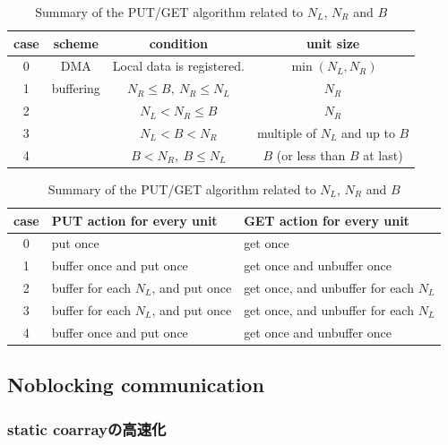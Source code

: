 \begin{table}[tbh]
 \caption{Summary of the PUT/GET algorithm related to $N_L$, $N_R$ and $B$}
 \label{tab:putget}
 \begin{flushleft}
  \begin{tabular}{|c||c|c|c|}
\hline
case & scheme 
& condition 
& unit size
\\
\hline
\hline
0 & DMA   
& Local data is registered.
& $\min(N_L, N_R)$   
\\
\hline
1 & buffering 
& $N_R \leq B,~ N_R \leq N_L$
& $N_R$
\\
\cline{1-1} \cline{3-4}
2 &
& $N_L < N_R \leq B$
& $N_R$
\\
\cline{1-1} \cline{3-4}
3 &
& $N_L < B < N_R$
& multiple of $N_L$ and up to $B$
\\
\cline{1-1} \cline{3-4}
4 &
& $B < N_R,~ B \leq N_L$
& $B$ (or less than $B$ at last)
\\
\hline
  \end{tabular}
 \end{flushleft}
 \begin{flushleft}
  \begin{tabular}{|c||l|l|}
\hline
case 
& PUT action for every unit
& GET action for every unit
\\
\hline
\hline
0 
& put once
& get once
\\
\hline
1 
& buffer once and put once
& get once and unbuffer once
\\
\hline
2 
& buffer for each $N_L$, and put once
& get once, and unbuffer for each $N_L$
\\
\hline
3 
& buffer for each $N_L$, and put once
& get once, and unbuffer for each $N_L$
\\
\hline
4 
& buffer once and put once
& get once and unbuffer once
\\
\hline
  \end{tabular}
 \end{flushleft}
\end{table}



\subsection{Noblocking communication}

\subsubsection{static coarrayの高速化}

